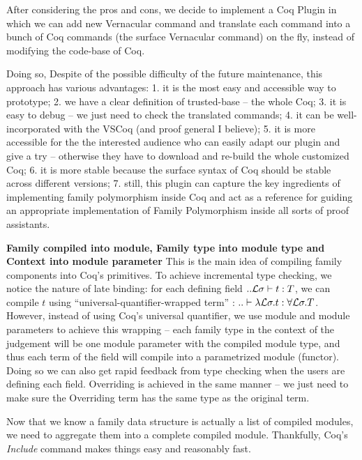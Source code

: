 After considering the pros and cons, we decide to implement a Coq Plugin in which we can add new Vernacular command and translate each command into a bunch of Coq commands (the surface Vernacular command) on the fly, instead of modifying the code-base of Coq. 

Doing so, Despite of the possible difficulty of the future maintenance, this approach has various advantages: 1. it is the most easy and accessible way to prototype; 2. we have a clear definition of trusted-base -- the whole Coq; 3. it is easy to debug -- we just need to check the translated commands; 4. it can be well-incorporated with the VSCoq (and proof general I believe); 5. it is more accessible for the the interested audience who can easily adapt our plugin and give a try -- otherwise they have to download and re-build the whole customized Coq; 6. it is more stable because the surface syntax of Coq should be stable across different versions; 7. still, this plugin can capture the key ingredients of implementing family polymorphism inside Coq and act as a reference for guiding an appropriate implementation of Family Polymorphism inside all sorts of proof assistants.

\textbf{Family compiled into module, Family type into module type and Context into module parameter} This is the main idea of compiling family components into Coq's primitives. To achieve incremental type checking, we notice the nature of late binding: for each defining field $ .. {\mathcal{L}}\sigma \vdash t : T $, we can compile $t$ using ``universal-quantifier-wrapped term'' : $.. \vdash \lambda {\mathcal{L}} \sigma. t : \forall {\mathcal{L}} \sigma. T$. However, instead of using Coq's universal quantifier, we use module and module parameters to achieve this wrapping -- each family type in the context of the judgement will be one module parameter with the compiled module type, and thus each term of the field will compile into a parametrized module (functor). Doing so we can also get rapid feedback from type checking when the users are defining each field. Overriding is achieved in the same manner -- we just need to make sure the Overriding term has the same type as the original term. 

Now that we know a family data structure is actually a list of compiled modules, we need to aggregate them into a complete compiled module. Thankfully, Coq's \textit{Include} command makes things easy and reasonably fast.  




